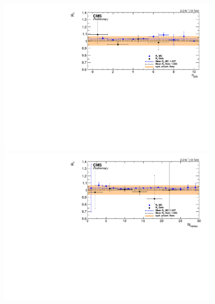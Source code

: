 \begin{figure}[htbp]
  \begin{minipage}[t]{0.3\textwidth}
    \includegraphics[width=\textwidth]{bkgd/figs/Triggereff_SFvsOF_Syst_PFHT_HighHTExclusiveCentral_Run2015_25ns_NJets_None_NonIso_MC.pdf}
  \end{minipage}
  \begin{minipage}[t]{0.3\textwidth}
    \includegraphics[width=\textwidth]{bkgd/figs/Triggereff_SFvsOF_Syst_PFHT_HighHTExclusiveCentral_Run2015_25ns_nVtx_None_NonIso_MC.pdf}
  \end{minipage}
  \begin{minipage}[t]{0.3\textwidth}

\end{minipage}
\end{figure}
